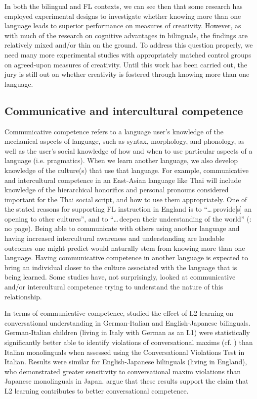 \documentclass[output=paper]{langscibook}
\begin{document}
In both the bilingual and FL contexts, we can see then that some research has employed experimental designs to investigate whether knowing more than one language leads to superior performance on measures of creativity. However, as with much of the research on cognitive advantages in bilinguals, the findings are relatively mixed and/or thin on the ground. To address this question properly, we need many more experimental studies with appropriately matched control groups on agreed-upon measures of creativity. Until this work has been carried out, the jury is still out on whether creativity is fostered through knowing more than one language.

\subsection{Communicative and intercultural competence}

Communicative competence refers to a language user’s knowledge of the mechanical aspects of language, such as syntax, morphology, and phonology, as well as the user’s social knowledge of how and when to use particular aspects of a language (i.e. pragmatics). When we learn another language, we also develop knowledge of the culture(s) that use that language. For example, communicative and intercultural competence in an East-Asian language like Thai will include knowledge of the hierarchical honorifics and personal pronouns considered important for the Thai social script, and how to use them appropriately. One of the stated reasons for supporting FL instruction in England is to ``\ldots\,provide[s] an opening to other cultures'', and to ``\ldots\,deepen their understanding of the world'' (\citealt{DfE2013curriculum}: no page). Being able to communicate with others using another language and having increased intercultural awareness and understanding are laudable outcomes one might predict would naturally stem from knowing more than one language. Having communicative competence in another language is expected to bring an individual closer to the culture associated with the language that is being learned. Some studies have, not surprisingly, looked at communicative and/or intercultural competence trying to understand the nature of this relationship. 

In terms of communicative competence, \citet{SiegalEtAl2010} studied the effect of L2 learning on conversational understanding in German-Italian and English-Japanese bilinguals. German-Italian children (living in Italy with German as an L1) were statistically significantly better able to identify violations of conversational maxims (cf. \citealt{Grice1975}) than Italian monolinguals when assessed using the Conversational Violations Test in Italian. Results were similar for English-Japanese bilinguals (living in England), who demonstrated greater sensitivity to conversational maxim violations than Japanese monolinguals in Japan. \citet{SiegalEtAl2010} argue that these results support the claim that L2 learning contributes to better conversational competence.
\end{document}

